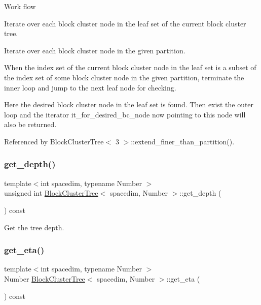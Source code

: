 \begin{DoxyDescription}
\item[Work flow ]

Iterate over each block cluster node in the leaf set of the current block cluster tree.

Iterate over each block cluster node in the given partition.

When the index set of the current block cluster node in the leaf set is a subset of the index set of some block cluster node in the given partition, terminate the inner loop and jump to the next leaf node for checking.

Here the desired block cluster node in the leaf set is found. Then exist the outer loop and the iterator {\ttfamily it\+\_\+for\+\_\+desired\+\_\+bc\+\_\+node} now pointing to this node will also be returned.


\end{DoxyDescription}

Referenced by Block\+Cluster\+Tree$<$ 3 $>$\+::extend\+\_\+finer\+\_\+than\+\_\+partition().

\mbox{\label{classBlockClusterTree_ab6c57acfcc5dfbbef04f028e6b9c749d}} 
\subsubsection{\texorpdfstring{get\+\_\+depth()}{get\_depth()}}
{\footnotesize\ttfamily template$<$int spacedim, typename Number $>$ \\
unsigned int \hyperlink{classBlockClusterTree}{Block\+Cluster\+Tree}$<$ spacedim, Number $>$\+::get\+\_\+depth (\begin{DoxyParamCaption}{ }\end{DoxyParamCaption}) const}

Get the tree depth. \mbox{\label{classBlockClusterTree_a312d01ddb6cf5560d84abf7d254fa2c3}} 
\subsubsection{\texorpdfstring{get\+\_\+eta()}{get\_eta()}}
{\footnotesize\ttfamily template$<$int spacedim, typename Number $>$ \\
Number \hyperlink{classBlockClusterTree}{Block\+Cluster\+Tree}$<$ spacedim, Number $>$\+::get\+\_\+eta (\begin{DoxyParamCaption}{ }\end{DoxyParamCaption}) const}

